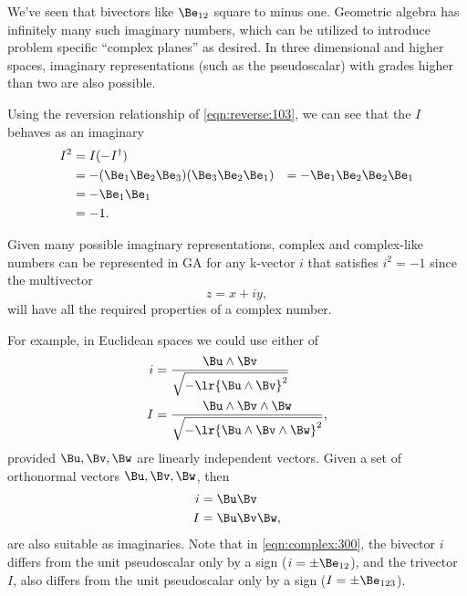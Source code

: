 %
%
We've seen that bivectors like \( \Be_{12} \) square to minus one.
Geometric algebra has infinitely many such imaginary numbers, which can be utilized to introduce problem specific ``complex planes'' as desired.
In three dimensional and higher spaces, imaginary representations
(such as the  pseudoscalar) with grades higher than two are also possible.

Using the reversion relationship of \cref{eqn:reverse:103}, we can see that the \( I \) behaves as an imaginary
\begin{equation}\label{eqn:complex:3310}
\begin{aligned}
I^2
&= I (-I^\dagger) \\
&= - (\Be_1 \Be_2 \Be_3)(\Be_3 \Be_2 \Be_1)
&= - \Be_1 \Be_2 \Be_2 \Be_1 \\
&= - \Be_1 \Be_1 \\
&= -1.
\end{aligned}
\end{equation}

Given many possible imaginary representations, complex and complex-like numbers can be represented in GA for any k-vector \( i \) that satisfies \( i^2 = -1 \) since the multivector
\begin{equation}\label{eqn:complex:260}
z = x + i y,
\end{equation}
will have all the required properties of a complex number.

For example, in Euclidean spaces we could use either of
\begin{equation}\label{eqn:complex:280}
\begin{aligned}
i &= \frac{\Bu \wedge \Bv}{\sqrt{-\lr{\Bu\wedge\Bv}^2}} \\
I &= \frac{\Bu \wedge \Bv \wedge \Bw}{\sqrt{-\lr{\Bu\wedge\Bv\wedge \Bw}^2}},
\end{aligned}
\end{equation}
provided \( \Bu, \Bv, \Bw \) are linearly independent vectors.
Given a set of orthonormal vectors \( \Bu, \Bv, \Bw \), then
\begin{equation}\label{eqn:complex:300}
\begin{aligned}
i &= \Bu \Bv \\
I &= \Bu \Bv \Bw,
\end{aligned}
\end{equation}
are also suitable as imaginaries.  Note that in \cref{eqn:complex:300}, the bivector \( i \) differs from the unit  pseudoscalar only by a sign (\( i = \pm \Be_{12} \)), and the trivector \( I \), also differs from the  unit pseudoscalar only by a sign (\( I = \pm \Be_{123} \)).

